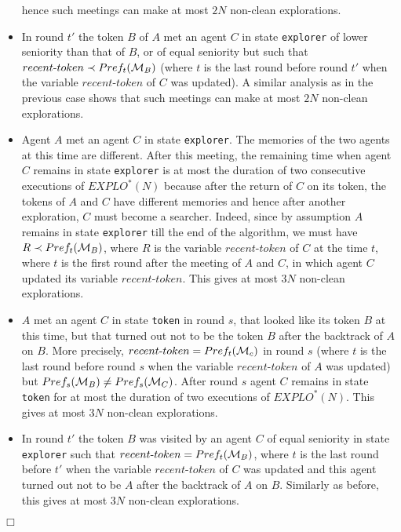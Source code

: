 \documentclass[11pt]{article}
\newcommand{\qed}{\hfill $\Box$ \bigbreak}
\newenvironment{proof}{\noindent {\bf Proof.}}{\qed}
\newcommand{\cM}{{\cal M}}
\begin{document}
\begin{proof}
\begin{itemize}
   hence such meetings can make at most $2N$ non-clean explorations.  
    \item
    {In round $t'$} the token $B$ of $A$ met an agent $C$  in state {\tt explorer} of lower seniority than that of $B$, or of equal seniority but such that $recent\mbox{-}token \prec Pref_t(\cM_B)$ {(where $t$ is the last round before round $t'$ when the variable $recent$-$token$ of $C$ was updated)}.
     A similar analysis as in the previous case shows that such meetings can make at most $2N$ non-clean explorations. 
     \item
     Agent $A$ met an agent $C$ in state {\tt explorer}. The memories of the two agents at this time are different. After this meeting,
   the remaining time when agent $C$ remains in state {\tt explorer} is at most the duration of two consecutive executions of $EXPLO^*(N)$ because after the 
   return of $C$ on its token, the tokens of $A$ and $C$ have different memories and hence after another exploration, $C$ must become a searcher.
   Indeed, since by assumption $A$ remains in state {\tt explorer} till the end of the algorithm, we must have $R \prec Pref_t(\cM_B)$, where $R$ is the variable $recent$-$token$ of $C$ at the time $t$, where $t$ is the first round after the meeting of $A$ and $C$, in which agent $C$ updated its variable $recent$-$token$. 
  This gives at most $3N$ non-clean explorations. 
   \item
   $A$ met an agent $C$  in state {\tt token} in round $s$, that looked like its token $B$ at this time, but that turned out not to be the token $B$ after the backtrack
    of $A$ on $B$. More precisely, $recent\mbox{-}token=Pref_t(\cM_c)$ in round $s$ (where $t$ is the last round {before round $s$} when the variable $recent$-$token$ of $A$ was updated)
    but $Pref_s(\cM_B) \neq Pref_s(\cM_C)$. After round $s$ agent $C$ remains in state {\tt token} for at most the duration of two executions of $EXPLO^*(N)$.
    This gives at most $3N$ non-clean explorations.
    \item
   {In round $t'$ the token $B$ was visited by an agent $C$ of equal seniority in state {\tt explorer} such that $recent\mbox{-}token = Pref_t(\cM_B)$, where $t$ is the last round before $t'$ when the variable $recent$-$token$ of $C$ was updated and this agent turned out not to be $A$ after 
    the backtrack of $A$ on $B$. Similarly as before, this gives at most $3N$ non-clean explorations.}
     \end{itemize}
     

\end{proof}
\end{document}

